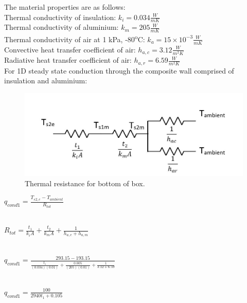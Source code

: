 The material properties are as follows: \\

Thermal conductivity of insulation: $ k_{i} = 0.034 \frac{W}{m K} $ \\
Thermal conductivity of aluminium: $ k_{m} = 205 \frac{W}{m K} $ \\
Thermal conductivity of air at 1 kPa, -80\textsuperscript{o}C: $ k_{a} = 15\times10^{-3} \frac{W}{m K} $ \\ 
Convective heat transfer coefficient of air: $ h_{a,c} = 3.12 \frac{W}{m^{2} K} $ \\ 
Radiative heat transfer coefficient of air: $ h_{a,r} = 6.59 \frac{W}{m^{2} K} $ \\ 

For 1D steady state conduction through the composite wall comprised of insulation and aluminium: \\

	\begin{figure}[h!]
    \centering
    \includegraphics[scale=0.6]{4-experiment-design/img/mechanical/thermalresistance1.JPG}
	\caption{Thermal resistance for bottom of box.}
	\label{fig:thermalresistance1}
	\end{figure}

\begin{center}
 $q_{cond1} = \frac{T_{s2,e}-T_{ambient}}{R_{tot}} $\\
 
 \ 
 
 $R_{tot} = \frac{t_{1}}{k_{i}A} + \frac{t_{2}}{k_{m}A} + \frac{1}{h_{a,e}+h_{a,m}} $\\
 
 \
 \ 
 
 $q_{cond1} = \frac{293.15 - 193.15}{\frac{t_{1}}{(0.034)(0.01)} + \frac{0.005}{(205)(0.01)} + \frac{1}{3.12+6.59}} $\\
 
 \  
 \ 
 
 $q_{cond1} = \frac{100}{2940t_{1}+0.105} $\\
 
\end{center}
 

